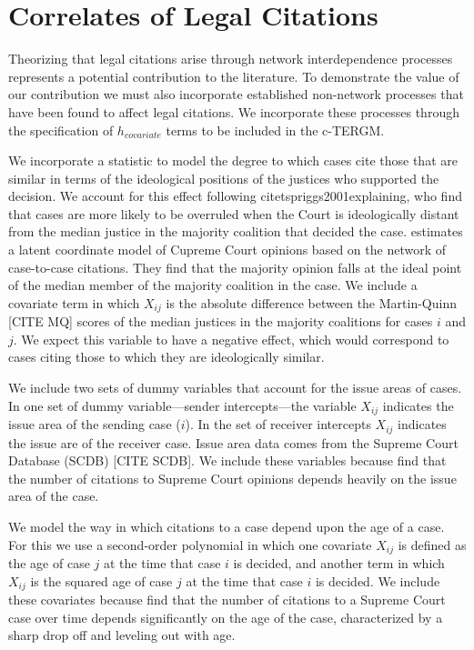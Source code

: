 \documentclass[headsepline=true, abstracton]{scrartcl}
\begin{document}
\section{Correlates of Legal Citations}

Theorizing that legal citations arise through network interdependence processes  represents a potential contribution to the literature. To demonstrate the value of our contribution we must also incorporate established non-network processes that have been found to affect legal citations. We incorporate these processes through the specification of $h_{covariate}$  terms to be included in the c-TERGM. 

We incorporate a statistic to model the degree to which cases cite those that are similar in terms of the ideological positions of the justices who supported the decision. We account for this effect following citet{spriggs2001explaining}, who find that cases are more likely to be overruled when the Court is ideologically distant from the median justice in the majority coalition that decided the case. \citet{clark2010locating} estimates a latent coordinate model of Cupreme Court opinions based on the network of case-to-case citations. They find that the majority opinion falls at the ideal point of the median member of the majority coalition in the case. We include a covariate term in which $X_{ij}$ is the absolute difference between the Martin-Quinn [CITE MQ] scores of the median justices in the majority coalitions for cases $i$ and $j$. We expect this variable to have a negative effect, which would correspond to cases citing those to which they are ideologically similar.%

We include two sets of dummy variables that account for the issue areas of cases. In one set of dummy variable---sender intercepts---the variable $X_{ij}$ indicates the issue area of the sending case ($i$). In the set of receiver intercepts $X_{ij}$ indicates the issue are of the receiver case. Issue area data comes from the Supreme Court Database (SCDB) [CITE SCDB]. We include these variables because \citet{cross2010determinants} find that the number of citations to Supreme Court opinions depends heavily on the issue area of the case.

We model the way in which citations to a case depend upon the age of a case. For this we use a second-order polynomial in which one covariate $X_{ij}$ is defined as the age of case $j$ at the time that case $i$ is decided, and another term in which $X_{ij}$ is the squared age of case $j$ at the time that case $i$ is decided. We include these covariates because \citet{black2013citation} find that the number of citations to a Supreme Court case over time depends significantly on the age of the case, characterized by a sharp drop off and leveling out with age. 
\end{document}
